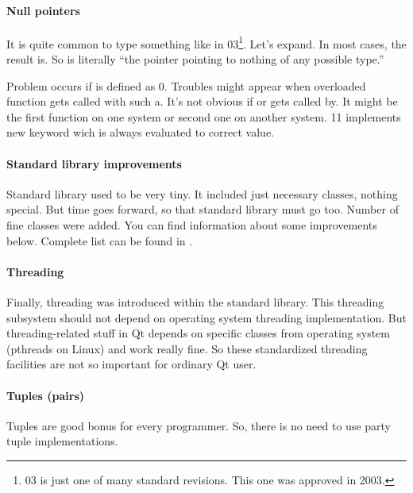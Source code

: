\paragraph*{Null pointers}
It is quite common to type something like in \cpp{} 03\footnote{\cpp{} 03 is just one of many \cpp{} standard revisions. This one was approved in 2003.}. Let's expand. In most cases, the result is. So is literally \enquote{the pointer pointing to nothing of any possible type.}

Problem occurs if is defined as $0$. Troubles might appear when overloaded function gets called with such a. It's not obvious if or gets called by. It might be the first function on one system or second one on another system. \cpp{} 11 implements new keyword wich is always evaluated to correct value.

\paragraph{Standard library improvements}
Standard library used to be very tiny. It included just necessary classes, nothing special. But time goes forward, so that standard library must go too. Number of fine classes were added. You can find information about some improvements below. Complete list can be found in \citep{various:cppstandard}.

\paragraph*{Threading}
Finally, threading was introduced within the standard library. This threading subsystem should not depend on operating system threading implementation. But threading-related stuff in Qt depends on specific classes from operating system (pthreads on Linux) and work really fine. So these standardized threading facilities are not so important for ordinary Qt user.

\paragraph*{Tuples (pairs)}
Tuples are good bonus for every \cpp{} programmer. So, there is no need to use  party tuple implementations.

